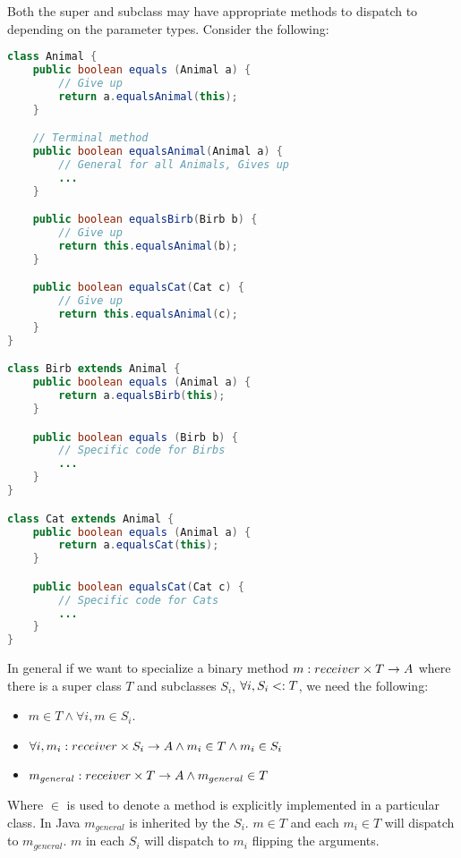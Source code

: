\documentclass{article}
\begin{document}
\begin{example}
Both the super and subclass may have appropriate methods to dispatch to depending on the parameter types.
Consider the following:
\begin{lstlisting}[language=Java, escapechar=|]
class Animal {
    public boolean equals (Animal a) {
        // Give up
        return a.equalsAnimal(this);
    }

    // Terminal method
    public boolean equalsAnimal(Animal a) {
        // General for all Animals, Gives up
        ...
    }

    public boolean equalsBirb(Birb b) {
        // Give up
        return this.equalsAnimal(b);
    }

    public boolean equalsCat(Cat c) {
        // Give up
        return this.equalsAnimal(c);
    }
}

class Birb extends Animal {
    public boolean equals (Animal a) {
        return a.equalsBirb(this);
    }

    public boolean equals (Birb b) {
        // Specific code for Birbs
        ...
    }
}

class Cat extends Animal {
    public boolean equals (Animal a) {
        return a.equalsCat(this);
    }

    public boolean equalsCat(Cat c) {
        // Specific code for Cats
        ...
    }
}
\end{lstlisting}
In general if we want to specialize a binary method $m : receiver{} \times T \rightarrow A$ where there is a super class $T$ and subclasses $S_i$, $\forall i, S_i <: T$, we need the following:
\begin{itemize}
\item $m \in T \wedge \forall i, m \in S_i$.
\item $\forall i, m_i : receiver{} \times S_i \rightarrow A \wedge m_i \in T \wedge m_i \in S_i$
\item $m_{general} : receiver{} \times T \rightarrow A \wedge m_{general} \in T$
\end{itemize}
Where $\in$ is used to denote a method is explicitly implemented in a particular class.
In Java $m_{general}$ is inherited by the $S_i$. $m \in T$ and each $m_i \in T$ will dispatch to $m_{general}$. $m$ in each $S_i$ will dispatch to $m_i$ flipping the arguments.
\end{example}
\end{document}
